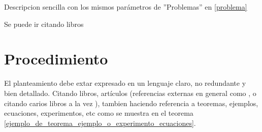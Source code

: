 \documentclass[a4paper]{IEEEtran} %
\begin{document}
Descripcion sencilla con los mismos parámetros de ''Problemas''  en \eqref{problema} %

Se puede ir citando libros \cite{libro2, libro3}


\section{Procedimiento}
\label{procedimiento}

El planteamiento debe extar expresado en un lenguaje claro, no redundante y bien detallado. Citando libros, artículos (referencias externas en general como \cite{libro1} , o citando carios libros a la vez \cite{libro4, libro5, libro6}), tambien haciendo referencia a teoremas, ejemplos, ecuaciones, experimentos, etc como se muestra en el teorema \eqref{ejemplo_de_teorema_ejemplo_o_experimento_ecuaciones}.
\end{document}
